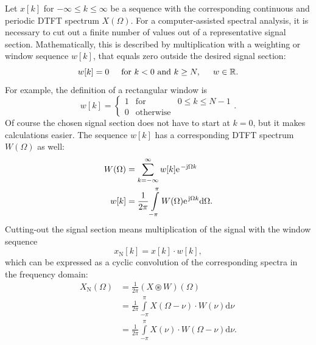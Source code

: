 \documentclass[11pt,a4paper,DIV=12]{scrartcl}
\begin{document}
Let $x[k]$ for $-\infty\leq k\leq\infty$ be a sequence with the corresponding
continuous and periodic DTFT spectrum $X(\Omega)$.
%
For a computer-assisted spectral analysis, it is necessary to cut out a finite
number of values out of a representative signal section.
%
Mathematically, this is described by multiplication with a weighting or window
sequence $w[k]$, that equals zero outside the desired signal section:
%
\begin{equation}
w[k]=0 \hspace{5mm} \text{for}\,\,k<0\,\,\text{and}\,\,k\geq N, \hspace{5mm} w\in\mathbb{R}.
\end{equation}
%
For example, the definition of a rectangular window is
%
\begin{equation}
w[k]=\left\{\begin{matrix}1 & \text{for} & 0\leq k\leq N-1\\0 & \text{otherwise} &\end{matrix}\right..
\end{equation}
%
Of course the chosen signal section does not have to start at $k=0$,
but it makes calculations easier.
%
The sequence $w[k]$ has a corresponding DTFT spectrum $W(\Omega)$ as well:
%
\begin{align}
W(\Omega)&=\sum_{k=-\infty}^{\infty}w[k]\e^{-\im\Omega k}\nonumber\\
w[k]&=\frac{1}{2\pi}\int\limits_{-\pi}^{\pi}W(\Omega)\e^{\im\Omega k}\text{d}\Omega.
\end{align}
%
Cutting-out the signal section means multiplication of the signal with the
window sequence
%
\begin{equation}
x_\text{N}[k]=x[k]\cdot w[k],
\end{equation}
%
which can be expressed as a cyclic convolution of the corresponding spectra in
the frequency domain:
%
\begin{align}
X_\text{N}(\Omega)&=\frac{1}{2\pi}(X\circledast W)(\Omega)\\
&=\frac{1}{2\pi}\int\limits_{-\pi}^{\pi}X(\Omega-\nu)\cdot W(\nu)\text{d}\nu\\
&= \frac{1}{2\pi}\int\limits_{-\pi}^{\pi}X(\nu)\cdot W(\Omega-\nu)\text{d}\nu.
\end{align}
\end{document}
